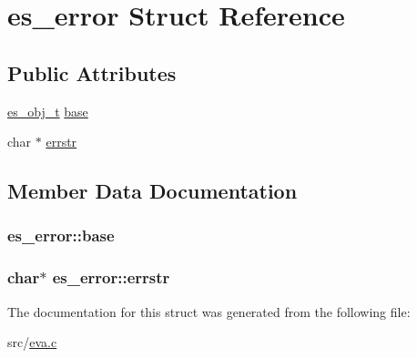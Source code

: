 \hypertarget{structes__error}{\section{es\-\_\-error Struct Reference}
\label{structes__error}
}
\subsection*{Public Attributes}
\begin{DoxyCompactItemize}
\item 
\hyperlink{eva_8h_a3370a89a85f5ff467ca5e7dba47e63bc}{es\-\_\-obj\-\_\-t} \hyperlink{structes__error_aa57282b877aa6c76de77c1657a50d605}{base}
\item 
char $\ast$ \hyperlink{structes__error_a658184fc4f1ea64606d09733cfe1f0ef}{errstr}
\end{DoxyCompactItemize}


\subsection{Member Data Documentation}
\hypertarget{structes__error_aa57282b877aa6c76de77c1657a50d605}{
\subsubsection[{base}]{ es\-\_\-error\-::base}}\label{structes__error_aa57282b877aa6c76de77c1657a50d605}
\hypertarget{structes__error_a658184fc4f1ea64606d09733cfe1f0ef}{
\subsubsection[{errstr}]{\setlength{\rightskip}{0pt plus 5cm}char$\ast$ es\-\_\-error\-::errstr}}\label{structes__error_a658184fc4f1ea64606d09733cfe1f0ef}


The documentation for this struct was generated from the following file\-:\begin{DoxyCompactItemize}
\item 
src/\hyperlink{eva_8c}{eva.\-c}\end{DoxyCompactItemize}
